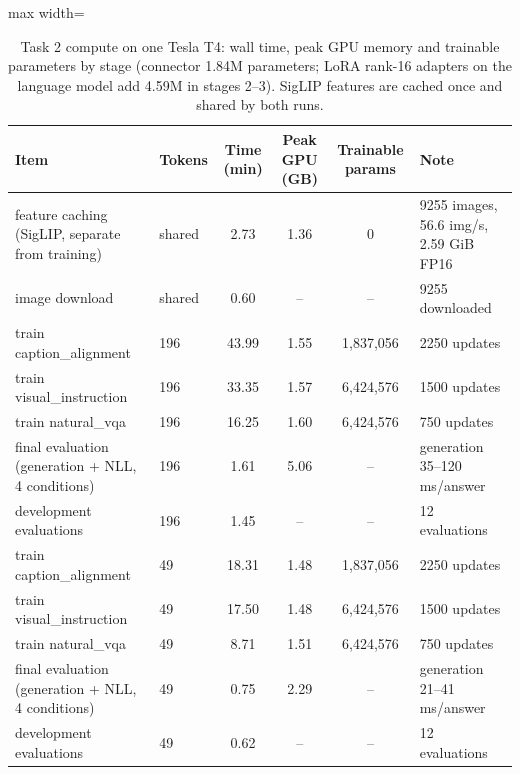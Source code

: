 \begin{table}[htbp]
\centering
\small
\caption{Task 2 compute on one Tesla T4: wall time, peak GPU memory and trainable parameters by stage (connector 1.84M parameters; LoRA rank-16 adapters on the language model add 4.59M in stages 2--3). SigLIP features are cached once and shared by both runs.}
\label{tab:t2-resources}
\begin{adjustbox}{max width=\linewidth}
\begin{tabular}{llcccl}
\toprule
Item & Tokens & Time (min) & Peak GPU (GB) & Trainable params & Note \\
\midrule
feature caching (SigLIP, separate from training) & shared & 2.73 & 1.36 & 0 & 9255 images, 56.6 img/s, 2.59 GiB FP16 \\
image download & shared & 0.60 & -- & -- & 9255 downloaded \\
\midrule
train caption\_alignment & 196 & 43.99 & 1.55 & 1{,}837{,}056 & 2250 updates \\
train visual\_instruction & 196 & 33.35 & 1.57 & 6{,}424{,}576 & 1500 updates \\
train natural\_vqa & 196 & 16.25 & 1.60 & 6{,}424{,}576 & 750 updates \\
final evaluation (generation + NLL, 4 conditions) & 196 & 1.61 & 5.06 & -- & generation 35--120 ms/answer \\
development evaluations & 196 & 1.45 & -- & -- & 12 evaluations \\
\midrule
train caption\_alignment & 49 & 18.31 & 1.48 & 1{,}837{,}056 & 2250 updates \\
train visual\_instruction & 49 & 17.50 & 1.48 & 6{,}424{,}576 & 1500 updates \\
train natural\_vqa & 49 & 8.71 & 1.51 & 6{,}424{,}576 & 750 updates \\
final evaluation (generation + NLL, 4 conditions) & 49 & 0.75 & 2.29 & -- & generation 21--41 ms/answer \\
development evaluations & 49 & 0.62 & -- & -- & 12 evaluations \\
\bottomrule
\end{tabular}
\end{adjustbox}
\end{table}
